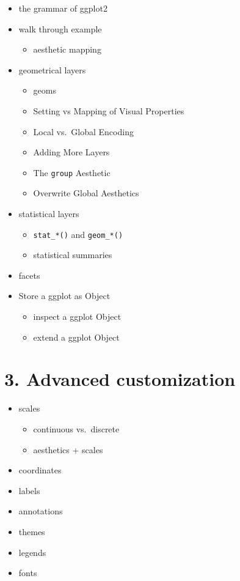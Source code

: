 \documentclass[
]{book}
\providecommand{\tightlist}{%
  \setlength{\itemsep}{0pt}\setlength{\parskip}{0pt}}
\begin{document}
\begin{itemize}
\tightlist
\item
  the grammar of ggplot2
\item
  walk through example

  \begin{itemize}
  \tightlist
  \item
    aesthetic mapping
  \end{itemize}
\item
  geometrical layers

  \begin{itemize}
  \tightlist
  \item
    geoms
  \item
    Setting vs Mapping of Visual Properties
  \item
    Local vs.~Global Encoding
  \item
    Adding More Layers
  \item
    The \texttt{group} Aesthetic
  \item
    Overwrite Global Aesthetics
  \end{itemize}
\item
  statistical layers

  \begin{itemize}
  \tightlist
  \item
    \texttt{stat\_*()} and \texttt{geom\_*()}
  \item
    statistical summaries
  \end{itemize}
\item
  facets
\item
  Store a ggplot as Object

  \begin{itemize}
  \tightlist
  \item
    inspect a ggplot Object
  \item
    extend a ggplot Object
  \end{itemize}
\end{itemize}

\hypertarget{advanced-customization}{%
\section{3. Advanced customization}\label{advanced-customization}}

\begin{itemize}
\tightlist
\item
  scales

  \begin{itemize}
  \tightlist
  \item
    continuous vs.~discrete
  \item
    aesthetics + scales
  \end{itemize}
\item
  coordinates
\item
  labels
\item
  annotations
\item
  themes
\item
  legends
\item
  fonts
\end{itemize}
\end{document}
